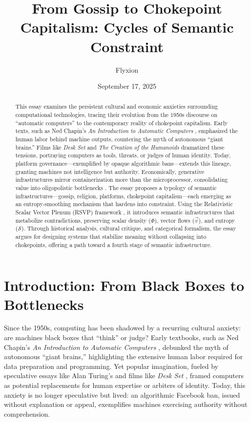 \documentclass[a4paper,12pt]{article}
\newcommand{\Scal}{\mathcal{S}} %
\newcommand{\vvec}{\vec{v}} %
\begin{document}
\title{From Gossip to Chokepoint Capitalism: Cycles of Semantic Constraint}
\author{Flyxion}
\date{September 17, 2025}
\maketitle

\begin{abstract}
This essay examines the persistent cultural and economic anxieties surrounding computational technologies, tracing their evolution from the 1950s discourse on ``automatic computers'' to the contemporary reality of chokepoint capitalism. Early texts, such as Ned Chapin’s \emph{An Introduction to Automatic Computers} \citep{chapin1963automatic}, emphasized the human labor behind machine outputs, countering the myth of autonomous ``giant brains.'' Films like \emph{Desk Set} \citep{deskset1957} and \emph{The Creation of the Humanoids} \citep{humanoids1962} dramatized these tensions, portraying computers as tools, threats, or judges of human identity. Today, platform governance—exemplified by opaque algorithmic bans—extends this lineage, granting machines not intelligence but authority. Economically, generative infrastructures mirror containerization more than the microprocessor, consolidating value into oligopolistic bottlenecks \citep{neumann2025ai,giblin2022chokepoint}. The essay proposes a typology of semantic infrastructures—gossip, religion, platforms, chokepoint capitalism—each emerging as an entropy-smoothing mechanism that hardens into constraint. Using the Relativistic Scalar Vector Plenum (RSVP) framework \citep{semantic2025}, it introduces semantic infrastructures that metabolize contradictions, preserving scalar density ($\Phi$), vector flows ($\vvec$), and entropy ($\Scal$). Through historical analysis, cultural critique, and categorical formalism, the essay argues for designing systems that stabilize meaning without collapsing into chokepoints, offering a path toward a fourth stage of semantic infrastructure.
\end{abstract}

\section*{Introduction: From Black Boxes to Bottlenecks}
Since the 1950s, computing has been shadowed by a recurring cultural anxiety: are machines black boxes that ``think'' or judge? Early textbooks, such as Ned Chapin’s \emph{An Introduction to Automatic Computers} \citep{chapin1963automatic}, debunked the myth of autonomous ``giant brains,'' highlighting the extensive human labor required for data preparation and programming. Yet popular imagination, fueled by speculative essays like Alan Turing’s \citep{turing1950computing} and films like \emph{Desk Set} \citep{deskset1957}, framed computers as potential replacements for human expertise or arbiters of identity. Today, this anxiety is no longer speculative but lived: an algorithmic Facebook ban, issued without explanation or appeal, exemplifies machines exercising authority without comprehension. 
\end{document}

